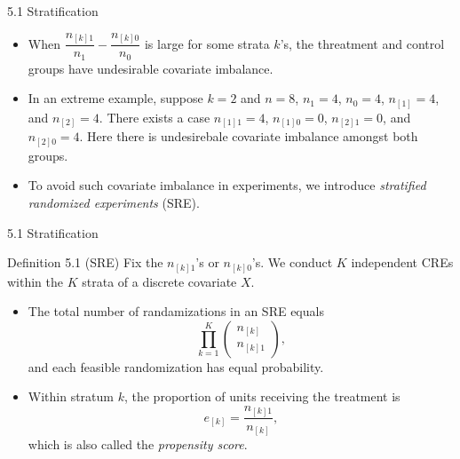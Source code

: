 \documentclass[aspectratio=169, 12pt]{beamer}
\begin{document}
\begin{frame}{5.1 Stratification}
  \begin{itemize}
    \item When $\dfrac{n_{[k]1}}{n_1}-\dfrac{n_{[k]0}}{n_0}$ is large for some strata $k$'s, the threatment and control groups have undesirable covariate imbalance.
    \item In an extreme example, suppose $k=2$ and $n=8$, $n_1=4$, $n_0=4$, $n_{[1]}=4$, and $n_{[2]}=4$. There exists a case $n_{[1]1}=4$, $n_{[1]0}=0$, $n_{[2]1}=0$, and $n_{[2]0}=4$. Here there is undesirebale covariate imbalance amongst both groups. 
    \item To avoid such covariate imbalance in experiments, we introduce \textit{stratified randomized experiments} (SRE).
  \end{itemize}
\end{frame}

\begin{frame}{5.1 Stratification}
  \begin{keybox}{Definition 5.1 (SRE)}
    Fix the $n_{[k]1}$'s or $n_{[k]0}$'s. We conduct $K$ independent CREs within the $K$ strata of a discrete covariate $X$.
  \end{keybox}
  \begin{itemize}
    \item The total number of randamizations in an SRE equals 
    \[
    \prod_{k=1}^{K}\begin{pmatrix}
      n_{[k]} \\ n_{[k]1}
    \end{pmatrix},
    \]
    and each feasible randomization has equal probability.
    \item Within stratum $k$, the proportion of units receiving the treatment is 
    \[
    e_{[k]}=\frac{n_{[k]1}}{n_{[k]}},
    \]
    which is also called the \textit{propensity score}.
  \end{itemize}
\end{frame}
\end{document}
